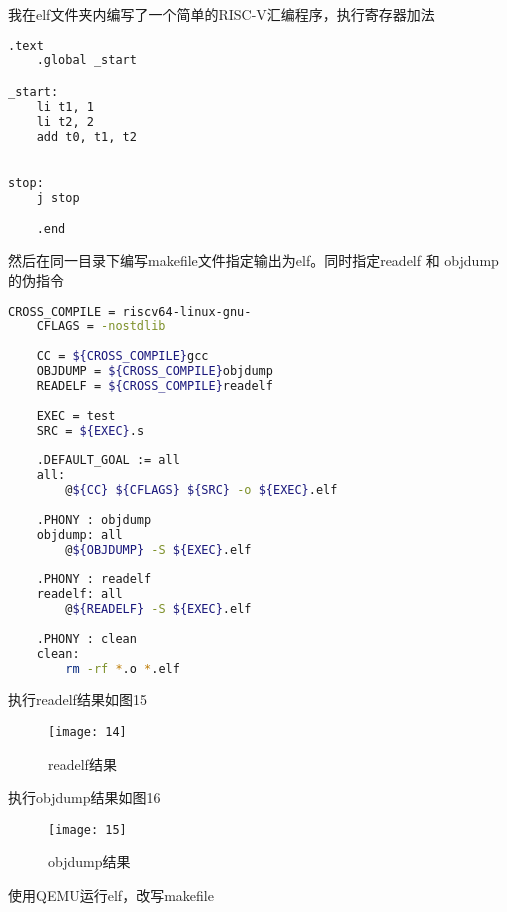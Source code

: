 \documentclass{source/Report}
\begin{document}
我在elf文件夹内编写了一个简单的RISC-V汇编程序，执行寄存器加法

\begin{lstlisting}[language = bash, title = {add}]
	.text			
	.global	_start		

_start:
	li t1, 1		
	li t2, 2		
	add t0, t1, t2	
    

stop:
	j stop			

	.end		
\end{lstlisting}

然后在同一目录下编写makefile文件指定输出为elf。同时指定readelf 和 objdump的伪指令

\begin{lstlisting}[language = bash, title = {makefile}]
    CROSS_COMPILE = riscv64-linux-gnu-
    CFLAGS = -nostdlib
    
    CC = ${CROSS_COMPILE}gcc
    OBJDUMP = ${CROSS_COMPILE}objdump
    READELF = ${CROSS_COMPILE}readelf
    
    EXEC = test
    SRC = ${EXEC}.s
    
    .DEFAULT_GOAL := all
    all:
        @${CC} ${CFLAGS} ${SRC} -o ${EXEC}.elf
    
    .PHONY : objdump
    objdump: all
        @${OBJDUMP} -S ${EXEC}.elf
    
    .PHONY : readelf
    readelf: all
        @${READELF} -S ${EXEC}.elf
    
    .PHONY : clean
    clean:
        rm -rf *.o *.elf	
\end{lstlisting}

执行readelf结果如图15

\begin{figure}[p]
    \centering
    \texttt{[image: 14]}
    \caption{readelf结果}
\end{figure}

执行objdump结果如图16

\begin{figure}[p]
    \centering
    \texttt{[image: 15]}
    \caption{objdump结果}
\end{figure}

使用QEMU运行elf，改写makefile
\end{document}
